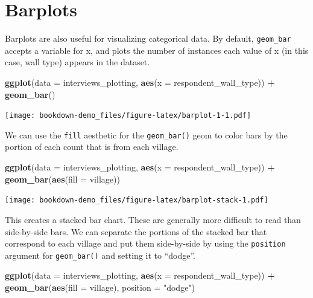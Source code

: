 \documentclass[]{book}
\newenvironment{Shaded}{\begin{snugshade}}{\end{snugshade}}
\newcommand{\KeywordTok}[1]{\textcolor[rgb]{0.13,0.29,0.53}{\textbf{#1}}}
\newcommand{\DataTypeTok}[1]{\textcolor[rgb]{0.13,0.29,0.53}{#1}}
\newcommand{\StringTok}[1]{\textcolor[rgb]{0.31,0.60,0.02}{#1}}
\newcommand{\OperatorTok}[1]{\textcolor[rgb]{0.81,0.36,0.00}{\textbf{#1}}}
\newcommand{\NormalTok}[1]{#1}
\begin{document}
\section{Barplots}\label{barplots}

Barplots are also useful for visualizing categorical data. By default,
\texttt{geom\_bar} accepts a variable for x, and plots the number of
instances each value of x (in this case, wall type) appears in the
dataset.

\begin{Shaded}
\begin{Highlighting}[]
\KeywordTok{ggplot}\NormalTok{(}\DataTypeTok{data =}\NormalTok{ interviews_plotting, }\KeywordTok{aes}\NormalTok{(}\DataTypeTok{x =}\NormalTok{ respondent_wall_type)) }\OperatorTok{+}
\StringTok{    }\KeywordTok{geom_bar}\NormalTok{()}
\end{Highlighting}
\end{Shaded}

\texttt{[image: bookdown-demo\_files/figure-latex/barplot-1-1.pdf]}

We can use the \texttt{fill} aesthetic for the \texttt{geom\_bar()} geom
to color bars by the portion of each count that is from each village.

\begin{Shaded}
\begin{Highlighting}[]
\KeywordTok{ggplot}\NormalTok{(}\DataTypeTok{data =}\NormalTok{ interviews_plotting, }\KeywordTok{aes}\NormalTok{(}\DataTypeTok{x =}\NormalTok{ respondent_wall_type)) }\OperatorTok{+}
\StringTok{    }\KeywordTok{geom_bar}\NormalTok{(}\KeywordTok{aes}\NormalTok{(}\DataTypeTok{fill =}\NormalTok{ village))}
\end{Highlighting}
\end{Shaded}

\texttt{[image: bookdown-demo\_files/figure-latex/barplot-stack-1.pdf]}

This creates a stacked bar chart. These are generally more difficult to
read than side-by-side bars. We can separate the portions of the stacked
bar that correspond to each village and put them side-by-side by using
the \texttt{position} argument for \texttt{geom\_bar()} and setting it
to ``dodge''.

\begin{Shaded}
\begin{Highlighting}[]
\KeywordTok{ggplot}\NormalTok{(}\DataTypeTok{data =}\NormalTok{ interviews_plotting, }\KeywordTok{aes}\NormalTok{(}\DataTypeTok{x =}\NormalTok{ respondent_wall_type)) }\OperatorTok{+}
\StringTok{    }\KeywordTok{geom_bar}\NormalTok{(}\KeywordTok{aes}\NormalTok{(}\DataTypeTok{fill =}\NormalTok{ village), }\DataTypeTok{position =} \StringTok{"dodge"}\NormalTok{)}
\end{Highlighting}
\end{Shaded}
\end{document}
